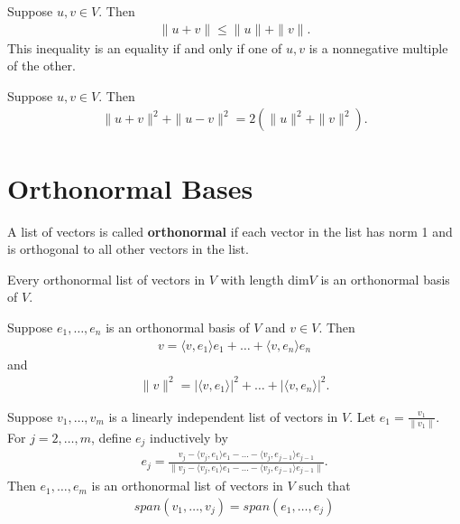 \documentclass{memoir}
\begin{document}
\begin{thm}
	Suppose $u,v \in V$. Then
	\begin{align*}
 \|u+v\| \leq \|u\|+ \|v\|.
	\end{align*}
	This inequality is an equality if and only if one of $u,v$ is a nonnegative multiple of the other.
\end{thm}
\begin{thm}
	Suppose $u,v \in V$. Then
	\begin{align*}
 \|u+v\|^2 + \|u-v\|^2 = 2\left( \|u\|^2+ \|v\|^2 \right) .
	\end{align*}
\end{thm}
\section{Orthonormal Bases}
\label{sec:orthonormal_bases}
\begin{defn}[Orthonormal]
	A list of vectors is called \textbf{orthonormal} if each vector in the list has norm 1 and is orthogonal to all other vectors in the list.
\end{defn}
\begin{cor}
	Every orthonormal list of vectors in $V$ with length \textrm{dim}$V$ is an orthonormal basis of $V$.
\end{cor}
\begin{lemma}
	Suppose $e_1,\ldots,e_n$ is an orthonormal basis of $V$ and $v \in V$. Then
	\begin{align*}
		v = \langle v, e_1 \rangle e_1 + \ldots + \langle v, e_n \rangle e_n
	\end{align*}
	and
	\begin{align*}
		\|v\|^2 = \left| \langle v, e_1 \rangle  \right|^2 + \ldots + \left| \langle v, e_n \rangle  \right|^2.
	\end{align*}
\end{lemma}
\begin{thm}
	Suppose $v_1,\ldots,v_m$ is a linearly independent list of vectors in $V$. Let $e_1 = \frac{v_1}{\|v_1\|}$. For $j=2,\ldots,m$, define $e_j$ inductively by
	\begin{align*}
		e_j = \frac{v_j - \langle v_j, e_1 \rangle e_1 - \ldots - \langle v_j, e_{j-1} \rangle e_{j-1}}{\|v_j - \langle v_j, e_1 \rangle e_1 - \ldots - \langle v_j, e_{j-1} \rangle e_{j-1}\|}.
	\end{align*}
Then $e_1,\ldots,e_m$ is an orthonormal list of vectors in $V$ such that
\begin{align*}
	span(v_1,\ldots,v_j) = span(e_1,\ldots,e_j)
\end{align*}
\end{thm}
\end{document}

